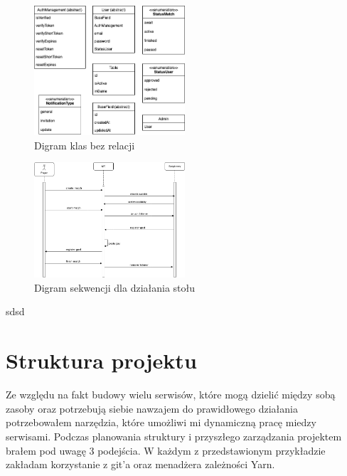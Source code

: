 \begin{figure}[h!]
  \centering
    \includegraphics[width=0.5\textwidth]{images/diagrams/class_diagram_rest.png}
  \caption{Digram klas bez relacji}
  \label{fig:mobile}
\end{figure}

\begin{figure}[h!]
  \centering
    \includegraphics[width=0.5\textwidth]{images/diagrams/match_event_flow.png}
  \caption{Digram sekwencji dla działania stołu}
  \label{fig:mobile}
\end{figure}

sdsd





\section{Struktura projektu}
Ze względu na fakt budowy wielu serwisów, które mogą dzielić między sobą zasoby oraz potrzebują siebie nawzajem do prawidłowego działania potrzebowałem narzędzia, które umożliwi mi dynamiczną pracę miedzy serwisami. Podczas planowania struktury i przyszłego zarządzania projektem brałem pod uwagę 3 podejścia. W każdym z przedstawionym przykładzie zakładam korzystanie z git'a oraz menadżera zależności Yarn.

